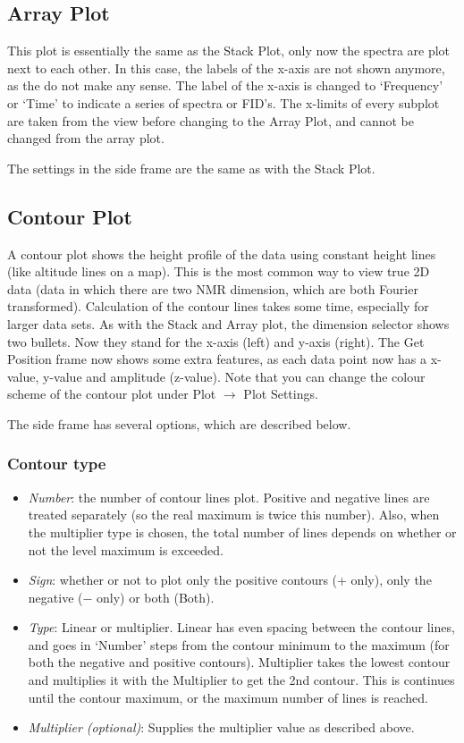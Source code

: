 \documentclass[11pt,a4paper]{article}
\begin{document}
\subsection{Array Plot}
This plot is essentially the same as the Stack Plot, only now the spectra are plot next to each other. In this case, the labels of the x-axis are
not shown anymore, as the do not make any sense. The label of the x-axis is changed to `Frequency' or `Time' to indicate a series of spectra or FID's.
The x-limits of every subplot are taken from the view before changing to the Array Plot, and cannot be changed from the array plot.

The settings in the side frame are the same as with the Stack Plot.


\subsection{Contour Plot}
A contour plot shows the height profile of the data using constant height lines (like altitude lines on a
map). This is the most common way to view true 2D data (data in which there are two NMR dimension, which are
both Fourier transformed). Calculation of the contour lines takes some time, especially for larger data sets.
As with the Stack and Array plot, the dimension selector shows two bullets. Now they stand for the x-axis
(left) and y-axis (right). The Get Position frame now shows some extra features, as each data point now has a
x-value, y-value and amplitude (z-value). Note that you can change the colour scheme of the contour plot under
Plot $\rightarrow$ Plot Settings.

The side frame has several options, which are described below.

\subsubsection*{Contour type}
\begin{itemize}
  \item \textit{Number}: the number of contour lines plot. Positive and negative lines are treated separately (so the real maximum is twice this number). Also, when
	 the multiplier type is chosen, the total number of lines depends on whether or not the level maximum is exceeded.
  \item \textit{Sign}: whether or not to plot only the positive contours (+ only), only the negative ($-$ only) or both (Both).
  \item \textit{Type}: Linear or multiplier. Linear has even spacing between the contour lines, and goes in `Number' steps from the contour minimum to the
	 maximum (for both the negative and positive contours). Multiplier takes the lowest contour and multiplies it with the Multiplier to get the 2nd contour. This is continues
	 until the contour maximum, or the maximum number of lines is reached.
  \item \textit{Multiplier (optional)}: Supplies the multiplier value as described above.
\end{itemize}
\end{document}
